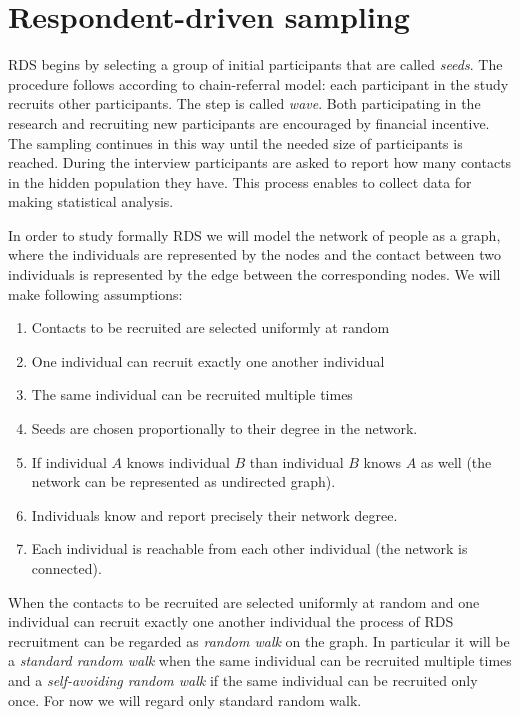 \documentclass[12pt]{report}
\begin{document}
\section{Respondent-driven sampling}
RDS begins by selecting a group of initial participants that are called \textit{seeds}. The procedure follows according to chain-referral model: each participant in the study recruits other participants. The step is called \textit{wave}. Both participating in the research and recruiting new participants are encouraged by financial incentive. The sampling continues in this way until the needed size of participants is reached. During the interview participants are asked to report how many contacts in the hidden population they have.
This process enables to collect data for making statistical analysis.

In order to study formally RDS we will model the network of people as a graph, where the individuals are represented by the nodes and the contact between two individuals is represented by the edge between the corresponding nodes. 
We will make following assumptions:
\begin{enumerate}
  \item Contacts to be recruited are selected uniformly at random
  \item One individual can recruit exactly one another individual
  \item The same individual can be recruited multiple times
  
  \item Seeds are chosen proportionally to their degree in the network.  
  \item If individual $A$ knows individual $B$ than individual $B$ knows $A$ as well (the network can be represented as undirected graph).
  
  \item Individuals know and report precisely their network degree. 
  \item Each individual is reachable from each other individual (the network is connected). 
\end{enumerate}


When the contacts to be recruited are selected uniformly at random and one individual can recruit exactly one another individual the process of RDS recruitment can be regarded as \textit{random walk} on the graph. In particular it will be a \textit{standard random walk} when the same individual can be recruited multiple times and a \textit{self-avoiding random walk} if the same individual can be recruited only once. For now we will regard only standard random walk.
\end{document}
